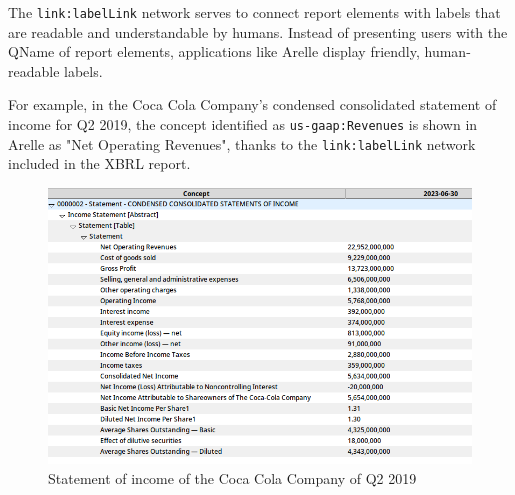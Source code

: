 The \texttt{link:labelLink} network serves to connect report elements with labels that are readable and understandable by humans.
Instead of presenting users with the QName of report elements, applications like Arelle display friendly, human-readable labels.

For example, in the Coca Cola Company's condensed consolidated statement of income for Q2 2019,
the concept identified as \texttt{us-gaap:Revenues} is shown in Arelle as "Net Operating Revenues",
thanks to the \texttt{link:labelLink} network included in the XBRL report.

\begin{figure}[H]
    \centering
    \includegraphics[width=\textwidth]{images/coca_cola_2019_q2.png}
    \caption{Statement of income of the Coca Cola Company of Q2 2019}
    \label{fig:coca_cola_2019_q2}
\end{figure}




